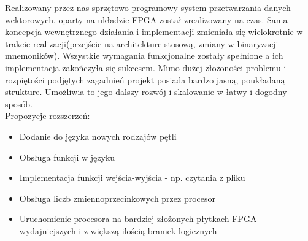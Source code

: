 Realizowany przez nas sprzętowo-programowy system przetwarzania danych wektorowych, oparty na układzie FPGA został zrealizowany na czas. Sama koncepcja wewnętrznego działania i implementacji zmieniała się wielokrotnie w trakcie realizacji(przejście na architekture stosową, zmiany w binaryzacji mnemoników). Wszystkie wymagania funkcjonalne zostały spełnione a ich implementacja zakończyła się sukcesem. Mimo dużej złożoności problemu i rozpiętości podjętych zagadnień projekt posiada bardzo jasną, poukładaną strukture. Umożliwia to jego dalszy rozwój i skalowanie w łatwy i dogodny sposób.\\Propozycje rozszerzeń:
\begin{itemize}
  \item Dodanie do języka nowych rodzajów pętli
  \item Obsługa funkcji w języku
  \item Implementacja funkcji wejścia-wyjścia - np. czytania z pliku
  \item Obsługa liczb zmiennoprzecinkowych przez procesor
  \item Uruchomienie procesora na bardziej złożonych płytkach FPGA - wydajniejszych i z większą ilością bramek logicznych
\end{itemize}